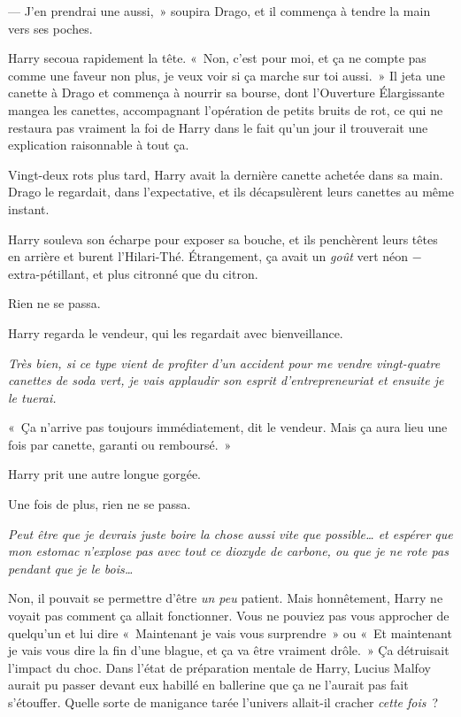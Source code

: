 --- J'en prendrai une aussi,~» soupira Drago, et il commença à tendre la main vers ses poches.

Harry secoua rapidement la tête. «~Non, c'est pour moi, et ça ne compte pas comme une faveur non plus, je veux voir si ça marche sur toi aussi.~» Il jeta une canette à Drago et commença à nourrir sa bourse, dont l'Ouverture Élargissante mangea les canettes, accompagnant l'opération de petits bruits de rot, ce qui ne restaura pas vraiment la foi de Harry dans le fait qu'un jour il trouverait une explication raisonnable à tout ça.

Vingt-deux rots plus tard, Harry avait la dernière canette achetée dans sa main. Drago le regardait, dans l'expectative, et ils décapsulèrent leurs canettes au même instant.

Harry souleva son écharpe pour exposer sa bouche, et ils penchèrent leurs têtes en arrière et burent l'Hilari-Thé. Étrangement, ça avait un \emph{goût} vert néon − extra-pétillant, et plus citronné que du citron.

Rien ne se passa.

Harry regarda le vendeur, qui les regardait avec bienveillance.

\emph{Très bien, si ce type vient de profiter d'un accident pour me vendre vingt-quatre canettes de soda vert, je vais applaudir son esprit d'entrepreneuriat et ensuite je le tuerai.}

«~Ça n'arrive pas toujours immédiatement, dit le vendeur. Mais ça aura lieu une fois par canette, garanti ou remboursé.~»

Harry prit une autre longue gorgée.

Une fois de plus, rien ne se passa.

\emph{Peut être que je devrais juste boire la chose aussi vite que possible… et espérer que mon estomac n'explose pas avec tout ce dioxyde de carbone, ou que je ne rote pas pendant que je le bois…}

Non, il pouvait se permettre d'être \emph{un peu} patient. Mais honnêtement, Harry ne voyait pas comment ça allait fonctionner. Vous ne pouviez pas vous approcher de quelqu'un et lui dire «~Maintenant je vais vous surprendre~» ou «~Et maintenant je vais vous dire la fin d'une blague, et ça va être vraiment drôle.~» Ça détruisait l'impact du choc. Dans l'état de préparation mentale de Harry, Lucius Malfoy aurait pu passer devant eux habillé en ballerine que ça ne l'aurait pas fait s'étouffer. Quelle sorte de manigance tarée l'univers allait-il cracher \emph{cette fois}~?

